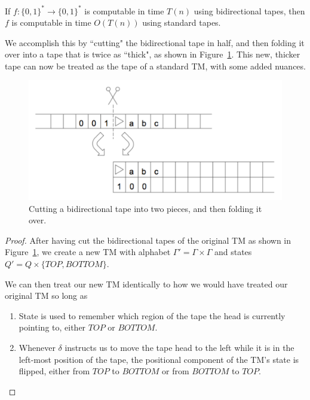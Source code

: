 \documentclass[usletter]{article}
\begin{document}
\begin{definition}
If $f : \{0,1\}^* \rightarrow \{0,1\}^*$ is computable in time $T(n)$ using bidirectional tapes, then $f$ is computable in time $O(T(n))$ using standard tapes.
\end{definition}

We accomplish this by ``cutting" the bidirectional tape in half, and then folding it over into a tape that is twice as ``thick", as shown in Figure~\ref{fig:cut}. This new, thicker tape can now be treated as the tape of a standard TM, with some added nuances.

\begin{figure}[h!]
\begin{center}
\includegraphics[width=.7\textwidth]{cut}
\end{center}
\caption{Cutting a bidirectional tape into two pieces, and then folding it over.}
\label{fig:cut}
\end{figure}

\begin{proof}
After having cut the bidirectional tapes of the original TM as shown in Figure~\ref{fig:cut}, we create a new TM with alphabet $\Gamma'=\Gamma\times\Gamma$ and states $Q'=Q\times\{TOP, BOTTOM\}$.

We can then treat our new TM identically to how we would have treated our original TM so long as

\begin{enumerate}
\item State is used to remember which region of the tape the head is currently pointing to, either $TOP$ or $BOTTOM$.
\item Whenever $\delta$ instructs us to move the tape head to the left while it is in the left-most position of the tape, the positional component of the TM's state is flipped, either from $TOP$ to $BOTTOM$ or from $BOTTOM$ to $TOP$.
\end{enumerate}

\end{proof}
\end{document}
